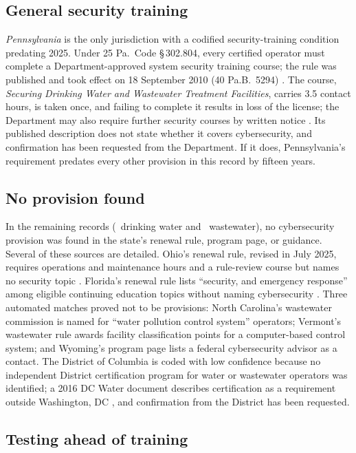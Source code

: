 \documentclass[10pt,twocolumn,letterpaper]{article}
\begin{document}
\subsection{General security training}

\emph{Pennsylvania} is the only jurisdiction with a codified security-training condition predating 2025. Under 25 Pa.\ Code \S\,302.804, every certified operator must complete a Department-approved system security training course; the rule was published and took effect on 18 September 2010 (40 Pa.B.\ 5294) \cite{pa302}. The course, \emph{Securing Drinking Water and Wastewater Treatment Facilities}, carries 3.5 contact hours, is taken once, and failing to complete it results in loss of the license; the Department may also require further security courses by written notice \cite{pa302,pasec01}. Its published description does not state whether it covers cybersecurity, and confirmation has been requested from the Department. If it does, Pennsylvania's requirement predates every other provision in this record by fifteen years.

\subsection{No provision found}

In the remaining records (\dwNone\ drinking water and \wwNone\ wastewater), no cybersecurity provision was found in the state's renewal rule, program page, or guidance. Several of these sources are detailed. Ohio's renewal rule, revised in July 2025, requires operations and maintenance hours and a rule-review course but names no security topic \cite{ohio}. Florida's renewal rule lists ``security, and emergency response'' among eligible continuing education topics without naming cybersecurity \cite{florida}. Three automated matches proved not to be provisions: North Carolina's wastewater commission is named for ``water pollution control system'' operators; Vermont's wastewater rule awards facility classification points for a computer-based control system; and Wyoming's program page lists a federal cybersecurity advisor as a contact. The District of Columbia is coded with low confidence because no independent District certification program for water or wastewater operators was identified; a 2016 DC Water document describes certification as a requirement outside Washington, DC \cite{dcwater}, and confirmation from the District has been requested.

\subsection{Testing ahead of training}
\end{document}
